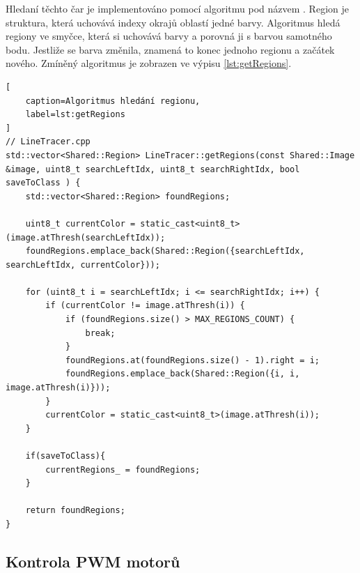 Hledaní těchto čar je implementováno pomocí algoritmu pod názvem .
Region je struktura, která uchovává indexy okrajů oblastí jedné barvy.
Algoritmus hledá regiony ve smyčce, která si uchovává barvy a porovná ji s barvou samotného bodu.
Jestliže se barva změnila, znamená to konec jednoho regionu a začátek nového.
Zmíněný algoritmus je zobrazen ve výpisu \ref{lst:getRegions}\cite{robot}.
\begin{lstlisting}[
	caption=Algoritmus hledání regionu,
	label=lst:getRegions
]
// LineTracer.cpp
std::vector<Shared::Region> LineTracer::getRegions(const Shared::Image &image, uint8_t searchLeftIdx, uint8_t searchRightIdx, bool saveToClass ) {
	std::vector<Shared::Region> foundRegions;

	uint8_t currentColor = static_cast<uint8_t>(image.atThresh(searchLeftIdx));
	foundRegions.emplace_back(Shared::Region({searchLeftIdx, searchLeftIdx, currentColor}));

	for (uint8_t i = searchLeftIdx; i <= searchRightIdx; i++) {
		if (currentColor != image.atThresh(i)) {
			if (foundRegions.size() > MAX_REGIONS_COUNT) {
				break;
			}
			foundRegions.at(foundRegions.size() - 1).right = i;
			foundRegions.emplace_back(Shared::Region({i, i, image.atThresh(i)}));
		}
		currentColor = static_cast<uint8_t>(image.atThresh(i));
	}

	if(saveToClass){
		currentRegions_ = foundRegions;
	}

	return foundRegions;
}
\end{lstlisting}

\subsection{Kontrola PWM motorů}\


